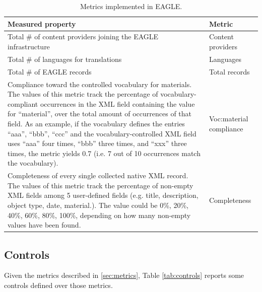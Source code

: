 \documentclass[amsthm,ebook]{saparticle}
\begin{document}
\begin{table}
{\small
\addtolength{\tabcolsep}{-0.5mm}
\begin{tabular*}{\textwidth}{ l l }
\toprule
Measured property & Metric\\
\midrule
\parbox[t]{0.6\textwidth}{Total \# of content providers joining the EAGLE infrastructure} & Content providers\\
Total \# of languages for translations & Languages\\
Total \# of EAGLE records & Total records\\
\parbox[t]{0.6\textwidth}{Compliance toward the controlled vocabulary for materials. The values of this metric track the percentage of vocabulary-compliant occurrences in the XML field containing the value for ``material'', over the total amount of occurrences of that field. As an example, if the vocabulary defines the entries ``aaa'', ``bbb'', ``ccc'' and the vocabulary-controlled XML field uses ``aaa'' four times, ``bbb'' three times, and ``xxx'' three times, the metric yields 0.7 (i.e. 7 out of 10 occurrences match the vocabulary).} & Voc:material compliance\\
\parbox[t]{0.6\textwidth}{Completeness of every single collected native XML record. The values of this metric track the percentage of non-empty XML fields among 5 user-defined fields (e.g. title, description, object type, date, material.). The value could be 0\%, 20\%, 40\%, 60\%, 80\%, 100\%, depending on how many non-empty values have been found.} & Completeness\\
\bottomrule
\end{tabular*}}
\caption{Metrics implemented in EAGLE.}
\label{tab:metrics}
\end{table}


\subsection{Controls}\label{sec:controls}

\noindent Given the metrics described in \ref{sec:metrics}, Table \ref{tab:controls} reports some controls defined over those metrics.
\end{document}
